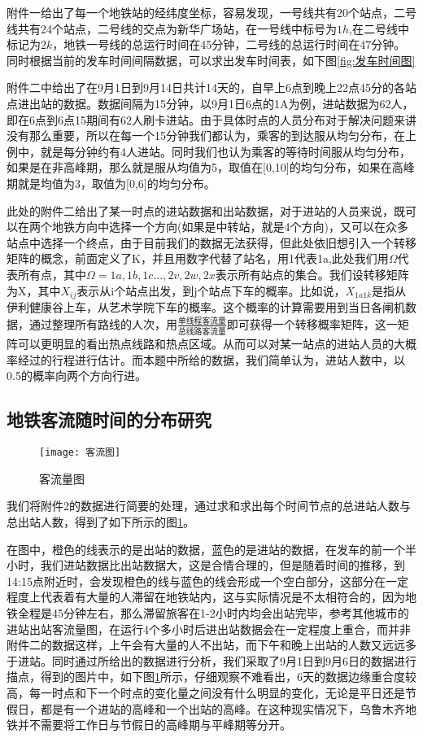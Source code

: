 \documentclass[12pt,a4paper]{mcmthesis}
\begin{document}
附件一给出了每一个地铁站的经纬度坐标，容易发现，一号线共有20个站点，二号线共有24个站点，二号线的交点为新华广场站，在一号线中标号为$1h$,在二号线中标记为$2k$，地铁一号线的总运行时间在45分钟，二号线的总运行时间在47分钟。同时根据当前的发车时间间隔数据，可以求出发车时间表，如下图\ref{fig:发车时间图}

附件二中给出了在9月1日到9月14日共计14天的，自早上6点到晚上22点45分的各站点进出站的数据。数据间隔为15分钟，以9月1日6点的1A为例，进站数据为62人，即在6点到6点15期间有62人刷卡进站。由于具体时点的人员分布对于解决问题来讲没有那么重要，所以在每一个15分钟我们都认为，乘客的到达服从均匀分布，在上例中，就是每分钟约有4人进站。同时我们也认为乘客的等待时间服从均匀分布，如果是在非高峰期，那么就是服从均值为5，取值在[0,10]的均匀分布，如果在高峰期就是均值为3，取值为[0,6]的均匀分布。

此处的附件二给出了某一时点的进站数据和出站数据，对于进站的人员来说，既可以在两个地铁方向中选择一个方向(如果是中转站，就是4个方向)，又可以在众多站点中选择一个终点，由于目前我们的数据无法获得，但此处依旧想引入一个转移矩阵的概念，前面定义了K，并且用数字代替了站名，用1代表1a,此处我们用$\Omega$代表所有点，其中$\Omega={1a,1b,1c...,2v,2w,2x}$表示所有站点的集合。我们设转移矩阵为X，其中$X_{ij}$表示从i个站点出发，到j个站点下车的概率。比如说，$X_{1a1k}$是指从伊利健康谷上车，从艺术学院下车的概率。这个概率的计算需要用到当日各闸机数据，通过整理所有路线的人次，用$\frac{单线程客流量}{总线路客流量}$即可获得一个转移概率矩阵，这一矩阵可以更明显的看出热点线路和热点区域。从而可以对某一站点的进站人员的大概率经过的行程进行估计。而本题中所给的数据，我们简单认为，进站人数中，以0.5的概率向两个方向行进。


\subsection{地铁客流随时间的分布研究}
\begin{figure}[h!t]
	\centerline{\texttt{[image: 客流图]}\quad
	}
	\caption{\song\wuhao
		客流量图}
	\label{fig:客流量}
\end{figure}


我们将附件2的数据进行简要的处理，通过求和求出每个时间节点的总进站人数与总出站人数，得到了如下所示的图\ref{fig:客流量}。

在图中，橙色的线表示的是出站的数据，蓝色的是进站的数据，在发车的前一个半小时，我们进站数据比出站数据大，这是合情合理的，但是随着时间的推移，到14:15点附近时，会发现橙色的线与蓝色的线会形成一个空白部分，这部分在一定程度上代表着有大量的人滞留在地铁站内，这与实际情况是不太相符合的，因为地铁全程是45分钟左右，那么滞留旅客在1-2小时内均会出站完毕，参考其他城市的进站出站客流量图，在运行4个多小时后进出站数据会在一定程度上重合，而并非附件二的数据这样，上午会有大量的人不出站，而下午和晚上出站的人数又远远多于进站。同时通过所给出的数据进行分析，我们采取了9月1日到9月6日的数据进行描点，得到的图片中，如下图\ref{fig:客流量}所示，仔细观察不难看出，6天的数据边缘重合度较高，每一时点和下一个时点的变化量之间没有什么明显的变化，无论是平日还是节假日，都是有一个进站的高峰和一个出站的高峰。在这种现实情况下，乌鲁木齐地铁并不需要将工作日与节假日的高峰期与平峰期等分开。
\end{document}
